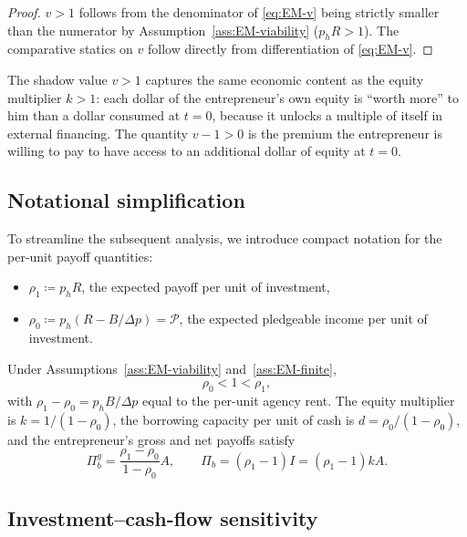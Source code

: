 \documentclass[11pt,a4paper,oneside]{book}
\theoremstyle{plain}
\theoremstyle{definition}
\theoremstyle{remark}
\numberwithin{equation}{chapter}
\begin{document}
\begin{proof}
$v > 1$ follows from the denominator of \eqref{eq:EM-v} being strictly smaller than the numerator by Assumption~\ref{ass:EM-viability} ($p_h R > 1$).
The comparative statics on $v$ follow directly from differentiation of \eqref{eq:EM-v}.
\end{proof}

The shadow value $v > 1$ captures the same economic content as the equity multiplier $k > 1$: each dollar of the entrepreneur's own equity is ``worth more'' to him than a dollar consumed at $t=0$, because it unlocks a multiple of itself in external financing.
The quantity $v - 1 > 0$ is the premium the entrepreneur is willing to pay to have access to an additional dollar of equity at $t=0$.

\subsection{Notational simplification}

To streamline the subsequent analysis, we introduce compact notation for the per-unit payoff quantities:

\begin{itemize}
  \item $\rho_1 \coloneqq p_h R$, the expected payoff per unit of investment,
  \item $\rho_0 \coloneqq p_h(R - B/\Delta p) = \mathcal{P}$, the expected pledgeable income per unit of investment.
\end{itemize}

Under Assumptions~\ref{ass:EM-viability} and~\ref{ass:EM-finite},
\begin{equation}\label{eq:EM-rho-order}
  \rho_0 < 1 < \rho_1,
\end{equation}
with $\rho_1 - \rho_0 = p_h B/\Delta p$ equal to the per-unit agency rent.
The equity multiplier is $k = 1/(1 - \rho_0)$, the borrowing capacity per unit of cash is $d = \rho_0/(1 - \rho_0)$, and the entrepreneur's gross and net payoffs satisfy
\begin{equation}\label{eq:EM-rho-payoffs}
  \Pi_b^g = \frac{\rho_1 - \rho_0}{1 - \rho_0} A, \qquad \Pi_b = (\rho_1 - 1) I = (\rho_1 - 1) k A.
\end{equation}

\subsection{Investment--cash-flow sensitivity}
\end{document}
